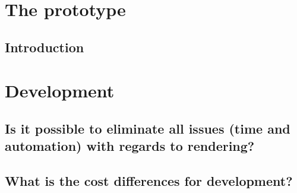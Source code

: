 \section{The prototype}
\subsection{Introduction}

\section{Development}

\subsection{Is it possible to eliminate all issues (time and automation) with regards to rendering?}

\subsection{What is the cost differences for development?}

